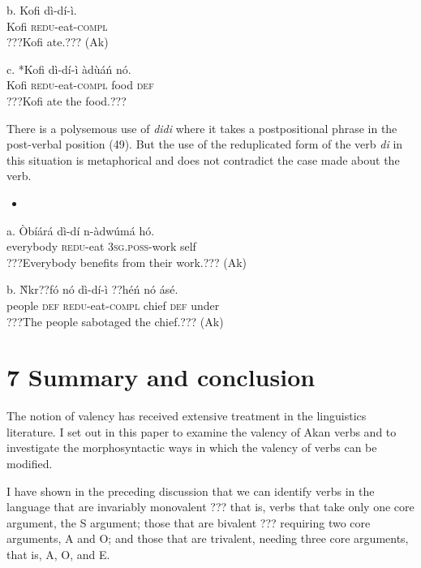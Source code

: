 \documentclass[output=paper]{langsci/langscibook}
\begin{document}
\gll  b.  Kofi  d\`{i}-d\'{i}-\`{i}.\\
       Kofi  \textsc{redu}{}-eat-\textsc{compl}\\
\glt   ???Kofi ate.??? (Ak)
\z

\gll  c.  *Kofi  d\`{i}-d\'{i}-\`{i}      \`{a}d\`{u}\'{a}\'{n}    n\'{o}.\\
       Kofi  \textsc{redu}{}-eat-\textsc{compl}  food    \textsc{def}\\
\glt   ???Kofi ate the food.???
\z

There is a polysemous use of \emph{didi} where it takes a postpositional phrase in the post-verbal position (49). But the use of the reduplicated form of the verb \emph{di} in this situation is metaphorical and does not contradict the case made about the verb.

\begin{itemize}
\item \end{itemize}
\gll a.  \`{O}b\'{i}\'{a}r\'{a}    d\`{i}-d\'{i}    n-\`{a}dw\'{u}m\'{a}    h\'{o}.\\
       everybody  \textsc{redu}{}-eat  \textsc{3sg.poss}{}-work  self\\
\glt   ???Everybody benefits from their work.??? (Ak)
\z

\gll  b.  \`{N}kr??f\'{o}  n\'{o}  d\`{i}-d\'{i}-\`{i}      ??h\'{e}\'{n}   n\'{o}  \'{a}s\'{e}.\\
       people  \textsc{def}  \textsc{redu}{}-eat-\textsc{compl}  chief  \textsc{def}  under\\
\glt   ???The people sabotaged the chief.??? (Ak)
\z

\chapter[7  Summary and conclusion]{7  Summary and conclusion}

The notion of valency has received extensive treatment in the linguistics literature. I set out in this paper to examine the valency of Akan verbs and to investigate the morphosyntactic ways in which the valency of verbs can be modified. 

I have shown in the preceding discussion that we can identify verbs in the language that are invariably monovalent ??? that is, verbs that take only one core argument, the S argument; those that are bivalent ??? requiring two core arguments, A and O; and those that are trivalent, needing three core arguments, that is, A, O, and E.
\end{document}
